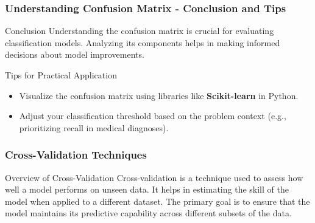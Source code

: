 \documentclass[aspectratio=169]{beamer}
\begin{document}
\begin{frame}[fragile]
    \frametitle{Understanding Confusion Matrix - Conclusion and Tips}
    \begin{block}{Conclusion}
        Understanding the confusion matrix is crucial for evaluating classification models.
        Analyzing its components helps in making informed decisions about model improvements.
    \end{block}

    \begin{block}{Tips for Practical Application}
        \begin{itemize}
            \item Visualize the confusion matrix using libraries like \textbf{Scikit-learn} in Python.
            \item Adjust your classification threshold based on the problem context (e.g., prioritizing recall in medical diagnoses).
        \end{itemize}
    \end{block}
\end{frame}

\begin{frame}[fragile]
    \frametitle{Cross-Validation Techniques}
    \begin{block}{Overview of Cross-Validation}
        Cross-validation is a technique used to assess how well a model performs on unseen data. It helps in estimating the skill of the model when applied to a different dataset. The primary goal is to ensure that the model maintains its predictive capability across different subsets of the data.
    \end{block}
\end{frame}
\end{document}
